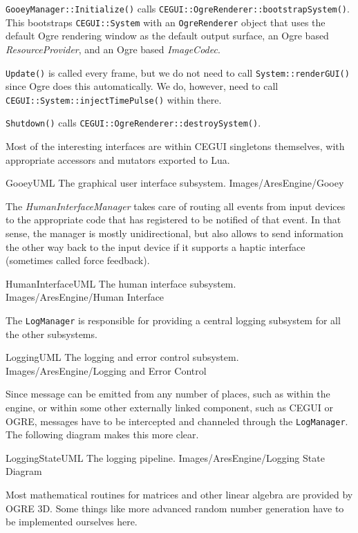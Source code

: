 {\tt GooeyManager::Initialize()} calls {\tt CEGUI::OgreRenderer::bootstrapSystem()}. This bootstraps {\tt CEGUI::System} with an {\tt OgreRenderer} object that uses the default Ogre rendering window as the default output surface, an Ogre based {\it ResourceProvider}, and an Ogre based {\it ImageCodec}.

{\tt Update()} is called every frame, but we do not need to call {\tt System::renderGUI()} since Ogre does this automatically. We do, however, need to call {\tt CEGUI::System::injectTimePulse()} within there.

{\tt Shutdown()} calls {\tt CEGUI::OgreRenderer::destroySystem()}.

Most of the interesting interfaces are within CEGUI singletons themselves, with appropriate accessors and mutators exported to Lua.

\FullPageLandscapeDiagram
    {GooeyUML}
    {The graphical user interface subsystem.}
    {Images/AresEngine/Gooey}

\page 
{}
The {\it HumanInterfaceManager} takes care of routing all events from input devices to the appropriate code that has registered to be notified of that event. In that sense, the manager is mostly unidirectional, but also allows to send information the other way back to the input device if it supports a haptic interface (sometimes called force feedback).

\FullPageLandscapeDiagram
    {HumanInterfaceUML}
    {The human interface subsystem.}
    {Images/AresEngine/Human Interface}

\page 
{}
The {\tt LogManager} is responsible for providing a central logging subsystem for all the other subsystems.

\FullPageLandscapeDiagram
    {LoggingUML}
    {The logging and error control subsystem.}
    {Images/AresEngine/Logging and Error Control}
    
Since message can be emitted from any number of places, such as within the engine, or within some other externally linked component, such as CEGUI or OGRE, messages have to be intercepted and channeled through the {\tt LogManager}. The following diagram makes this more clear.

\FullPageLandscapeDiagram
    {LoggingStateUML}
    {The logging pipeline.}
    {Images/AresEngine/Logging State Diagram}

\page 
{}
Most mathematical routines for matrices and other linear algebra are provided by OGRE 3D. Some things like more advanced random number generation have to be implemented ourselves here.

